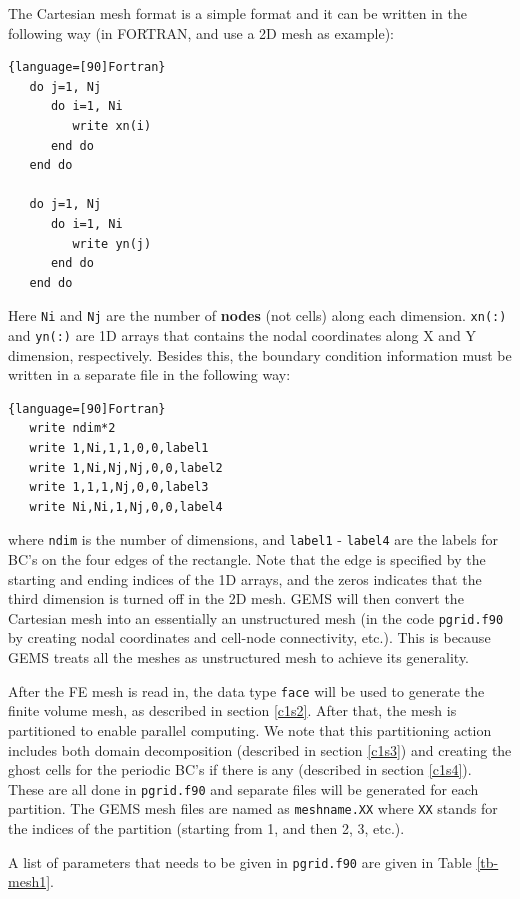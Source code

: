 \documentclass[12pt, letterpaper]{report}
\begin{document}
The Cartesian mesh format is a simple format and it can be written in the following way (in
FORTRAN, and use a 2D mesh as example):

\begin{lstlisting}{language=[90]Fortran}
   do j=1, Nj
      do i=1, Ni
         write xn(i)
      end do
   end do

   do j=1, Nj
      do i=1, Ni
         write yn(j)
      end do
   end do
\end{lstlisting}

Here \verb+Ni+ and \verb+Nj+ are the number of {\bf nodes} (not cells) along each dimension. \verb+xn(:)+ and
\verb+yn(:)+ are 1D arrays that contains the nodal coordinates along X and Y dimension,
respectively. Besides this, the boundary condition information must be written in a separate file in
the following way:

\begin{lstlisting}{language=[90]Fortran}
   write ndim*2
   write 1,Ni,1,1,0,0,label1
   write 1,Ni,Nj,Nj,0,0,label2
   write 1,1,1,Nj,0,0,label3
   write Ni,Ni,1,Nj,0,0,label4
\end{lstlisting}

where \verb+ndim+ is the number of dimensions, and \verb+label1+ - \verb+label4+ are the labels for
BC's on the four edges of the rectangle. Note that the edge is specified by the starting and ending
indices of the 1D arrays, and the zeros indicates that the third dimension is turned off in the 2D
mesh. GEMS will then convert the Cartesian mesh into an essentially an unstructured mesh (in the
code \verb+pgrid.f90+ by creating nodal coordinates and cell-node connectivity, etc.). This is because
GEMS treats all the meshes as unstructured mesh to achieve its generality.
\paraspace

After the FE mesh is read in, the data type \verb+face+ will be used to generate the finite volume
mesh, as described in section \ref{c1s2}. After that, the mesh is partitioned to enable parallel
computing. We note that this partitioning action includes both domain decomposition (described in
section \ref{c1s3}) and creating the ghost cells for the periodic BC's if there is any (described in
section \ref{c1s4}). These are all done in \verb+pgrid.f90+ and separate files will be generated for
each partition. The GEMS mesh files are named as \verb+meshname.XX+ where \verb+XX+ stands for the
indices of the partition (starting from 1, and then 2, 3, etc.).
\paraspace

A list of parameters that needs to be given in \verb+pgrid.f90+ are given in Table \ref{tb-mesh1}.
\end{document}
